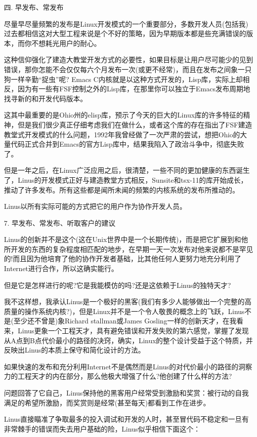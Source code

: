 \documentclass[a4paper,12pt,UTF8,twoside]{ctexbook}
\begin{document}
四. 早发布、常发布


尽量早尽量频繁的发布是Linux开发模式的一个重要部分，多数开发人员(包括我)过去都相信这对大型工程来说是个不好的策略，因为早期版本都是些充满错误的版本，而你不想耗光用户的耐心。

这种信仰强化了建造大教堂开发方式的必要性，如果目标是让用户尽可能少的见到错误，那你怎能不会仅仅每六个月发布一次(或更不经常)，而且在发布之间象一只狗一样辛勤“捉虫”呢? Emacs C内核就是以这种方式开发的，Lisp库，实际上却相反，因为有一些有FSF控制之外的Lisp库，在那里你可以独立于Emacs发布周期地找寻新的和开发代码版本。


这其中最重要的是Ohio州的elisp库，预示了今天的巨大的Linux库的许多特征的精神，但是我们很少真正仔细考虑我们在做什么，或者这个库的存在指出了FSF建造教堂式开发模式的什么问题，1992年我曾经做了一次严肃的尝试，想把Ohio的大量代码正式合并到Emacs的官方Lisp库中，结果我陷入了政治斗争中，彻底失败了。


但是一年之后，在Linux广泛应用之后，很清楚，一些不同的更加健康的东西诞生了，Linus的开发模式正好与建造教堂方式相反，Sunsite和tsx-11的库开始成长，推动了许多发布。所有这些都是闻所未闻的频繁的内核系统的发布所推动的。


Linus以所有实际可能的方式把它的用户作为协作开发人员。


7. 早发布、常发布、听取客户的建议

Linus的创新并不是这个(这在Unix世界中是一个长期传统)，而是把它扩展到和他所开发的东西的复杂程度相匹配的地步，在早期一天一次发布对他来说都不是罕见的!而且因为他培育了他的协作开发者基础，比其他任何人更努力地充分利用了Internet进行合作，所以这确实能行。


但是它是怎样进行的呢?它是我能模仿的吗?还是这依赖于Linus的独特天才?


我不这样想，我承认Linus是一个极好的黑客(我们有多少人能够做出一个完整的高质量的操作系统内核?)，但是Linux并不是一个令人敬畏的概念上的飞跃，Linus不是(至少还不曾是)象Richard stallman或James Gosling一样的创新天才，在我看来，Linus更象一个工程天才，具有避免错误和开发失败的第六感觉，掌握了发现从A点到B点代价最小的路径的决窍，确实，Linux的整个设计受益于这个特质，并反映出Linus的本质上保守和简化设计的方法。


如果快速的发布和充分利用Internet不是偶然而是Linus的对代价最小的路径的洞察力的工程天才的内在部分，那么他极大增强了什么?他创建了什么样的方法?


问题回答了它自己，Linus保持他的黑客用户经常受到激励和奖赏：被行动的自我满足的希望所激励，而奖赏则是经常(甚至每天)都看到工作在进步。


Linus直接瞄准了争取最多的投入调试和开发的人时，甚至冒代码不稳定和一旦有非常棘手的错误而失去用户基础的险，Linus似乎相信下面这个：
\end{document}
